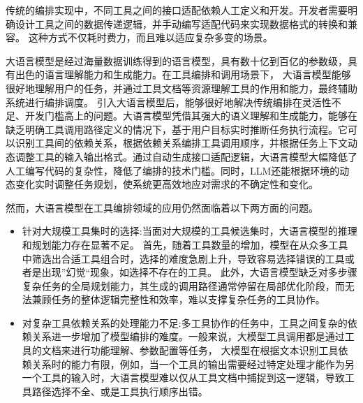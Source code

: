 传统的编排实现中，不同工具之间的接口适配依赖人工定义和开发。开发者需要明确设计工具之间的数据传递逻辑，并手动编写适配代码来实现数据格式的转换和兼容。
这种方式不仅耗时费力，而且难以适应复杂多变的场景。

大语言模型是经过海量数据训练得到的语言模型，具有数十亿到百亿的参数级，具有出色的语言理解能力和生成能力。在工具编排和调用场景下，
大语言模型能够很好地理解用户的任务，并通过工具文档等资源理解工具的作用和能力，最终辅助系统进行编排调度。
引入大语言模型后，能够很好地解决传统编排在灵活性不足、开发门槛高上的问题。大语言模型凭借其强大的语义理解和生成能力，能够在缺乏明确工具调用路径定义的情况下，基于用户目标实时推断任务执行流程。它可以识别工具间的依赖关系，根据依赖关系编排工具调用顺序，并根据任务上下文动态调整工具的输入输出格式。通过自动生成接口适配逻辑，大语言模型大幅降低了人工编写代码的复杂性，降低了编排的技术门槛。同时，LLM还能根据环境的动态变化实时调整任务规划，使系统更高效地应对需求的不确定性和变化。

然而，大语言模型在工具编排领域的应用仍然面临着以下两方面的问题。


\begin{itemize}
    \item 针对大规模工具集时的选择:当面对大规模的工具候选集时，大语言模型的推理和规划能力存在显著不足。
    首先，随着工具数量的增加，模型在从众多工具中筛选出合适工具组合时，选择的难度急剧上升，导致容易选择错误的工具或者是出现”幻觉“现象，如选择不存在的工具。
    此外，大语言模型缺乏对多步骤复杂任务的全局规划能力，其生成的调用路径通常停留在局部优化阶段，而无法兼顾任务的整体逻辑完整性和效率，难以支撑复杂任务的工具协作。
    \item 对复杂工具依赖关系的处理能力不足:多工具协作的任务中，工具之间复杂的依赖关系进一步增加了模型编排的难度。一般来说，大模型工具调用都是通过工具的文档来进行功能理解、参数配置等任务，
    大模型在根据文本识别工具依赖关系时的能力有限，例如，当一个工具的输出需要经过特定处理才能作为另一个工具的输入时，大语言模型难以仅从工具文档中捕捉到这一逻辑，导致工具路径选择不全、或是工具执行顺序出错。
\end{itemize}


